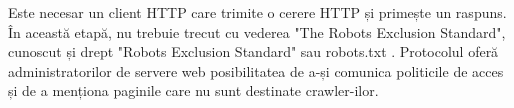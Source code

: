 Este necesar un client HTTP care trimite o cerere HTTP și primește un raspuns. În această etapă, nu trebuie trecut cu vederea "The Robots Exclusion Standard", cunoscut și drept "Robots Exclusion Standard" sau robots.txt \cite{RobotsStandard}. Protocolul oferă administratorilor de servere web posibilitatea de a-și comunica politicile de acces și de a menționa paginile care nu sunt destinate crawler-ilor.
\\